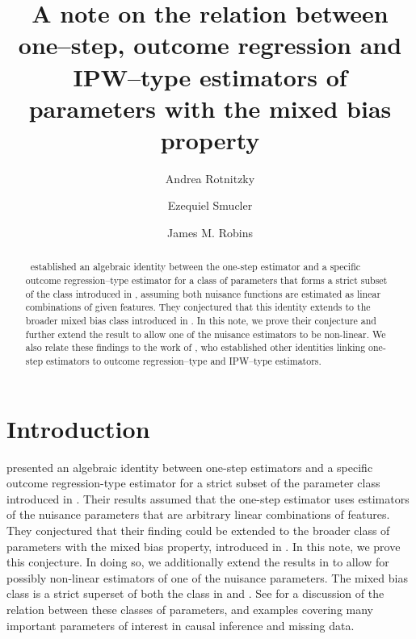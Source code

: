 \documentclass{article}
\begin{document}
\title{A note on the relation between one--step, outcome regression and IPW--type estimators of
parameters with the mixed bias property}
\author[1]{Andrea Rotnitzky}
\author[2]{Ezequiel Smucler}
\author[3]{James M. Robins}



\maketitle

\begin{abstract}
\cite{bruns2025augmented}\ established an algebraic identity between the
one-step estimator and a specific outcome regression--type estimator for a
class of parameters that forms a strict subset of the class introduced in 
\cite{chernozhukovclass}, assuming both nuisance functions are estimated as
linear combinations of given features. They conjectured that this identity
extends to the broader mixed bias class introduced in \cite{characterization}%
. In this note, we prove their conjecture and further extend the result to
allow one of the nuisance estimators to be non-linear. We also relate these
findings to the work of \cite{robins2007comment}, who established other identities
linking one-step estimators to outcome regression--type and IPW--type estimators.
\end{abstract}

\section{Introduction}

\cite{bruns2025augmented} presented an algebraic identity between one-step
estimators and a specific outcome regression-type estimator for a strict
subset of the parameter class introduced in \cite{chernozhukovclass}. Their results assumed that the one-step estimator uses estimators of the nuisance parameters that are arbitrary linear combinations of features. They conjectured that
their finding could be extended to the broader class of parameters with the
mixed bias property, introduced in \cite{characterization}. In this note, we
prove this conjecture. In doing so, we additionally extend the results in 
\cite{bruns2025augmented} to allow for possibly non-linear estimators of one
of the nuisance parameters. The mixed bias class is a strict superset of
both the class in \cite{chernozhukovclass} and \cite{jamieclass}. See \cite%
{characterization} for a discussion of the relation between these classes of
parameters, and examples covering many important parameters of interest in
causal inference and missing data.
\end{document}
